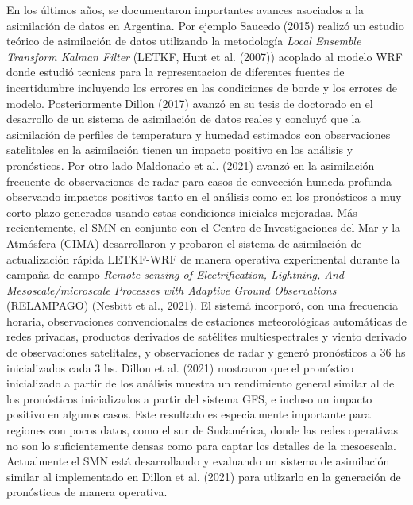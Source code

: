 \documentclass[12pt,oneside,a4paper]{reedthesis}
\begin{document}
En los últimos años, se documentaron importantes avances asociados a la asimilación de datos en Argentina. Por ejemplo Saucedo (2015) realizó un estudio teórico de asimilación de datos utilizando la metodología \emph{Local Ensemble Transform Kalman Filter} (LETKF, Hunt et al. (2007)) acoplado al modelo WRF donde estudió tecnicas para la representacion de diferentes fuentes de incertidumbre incluyendo los errores en las condiciones de borde y los errores de modelo. Posteriormente Dillon (2017) avanzó en su tesis de doctorado en el desarrollo de un sistema de asimilación de datos reales y concluyó que la asimilación de perfiles de temperatura y humedad estimados con observaciones satelitales en la asimilación tienen un impacto positivo en los análisis y pronósticos. Por otro lado Maldonado et al. (2021) avanzó en la asimilación frecuente de observaciones de radar para casos de convección humeda profunda observando impactos positivos tanto en el análisis como en los pronósticos a muy corto plazo generados usando estas condiciones iniciales mejoradas. Más recientemente, el SMN en conjunto con el Centro de Investigaciones del Mar y la Atmósfera (CIMA) desarrollaron y probaron el sistema de asimilación de actualización rápida LETKF-WRF de manera operativa experimental durante la campaña de campo \emph{Remote sensing of Electrification, Lightning, And Mesoscale/microscale Processes with Adaptive Ground Observations} (RELAMPAGO) (Nesbitt et al., 2021). El sistemá incorporó, con una frecuencia horaria, observaciones convencionales de estaciones meteorológicas automáticas de redes privadas, productos derivados de satélites multiespectrales y viento derivado de observaciones satelitales, y observaciones de radar y generó pronósticos a 36 hs inicializados cada 3 hs. Dillon et al. (2021) mostraron que el pronóstico inicializado a partir de los análisis muestra un rendimiento general similar al de los pronósticos inicializados a partir del sistema GFS, e incluso un impacto positivo en algunos casos. Este resultado es especialmente importante para regiones con pocos datos, como el sur de Sudamérica, donde las redes operativas no son lo suficientemente densas como para captar los detalles de la mesoescala. Actualmente el SMN está desarrollando y evaluando un sistema de asimilación similar al implementado en Dillon et al. (2021) para utlizarlo en la generación de pronósticos de manera operativa.
\end{document}

